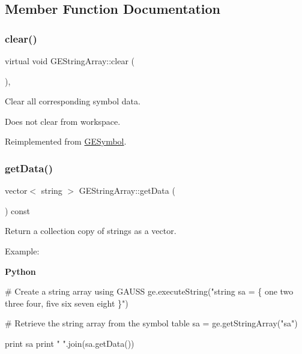 \subsection{Member Function Documentation}
\mbox{\label{class_g_e_string_array_a9bd5bd32a9efeb1e74128bd1d7c5c57d}} 
\subsubsection{\texorpdfstring{clear()}{clear()}}
{\footnotesize\ttfamily virtual void G\+E\+String\+Array\+::clear (\begin{DoxyParamCaption}{ }\end{DoxyParamCaption})\hspace{0.3cm}{\ttfamily [inline]}, {\ttfamily [virtual]}}



Clear all corresponding symbol data. 

Does not clear from workspace. 

Reimplemented from \hyperlink{class_g_e_symbol_a39d2e523aec771a73e1cc5d7a9618b88}{G\+E\+Symbol}.

\mbox{\label{class_g_e_string_array_aa61b05c339d69922cc3469737cedebdb}} 
\subsubsection{\texorpdfstring{get\+Data()}{getData()}}
{\footnotesize\ttfamily vector$<$ string $>$ G\+E\+String\+Array\+::get\+Data (\begin{DoxyParamCaption}{ }\end{DoxyParamCaption}) const}



Return a collection copy of strings as a vector. 

Example\+:

{\bfseries Python} 
\begin{DoxyCode}
\textcolor{comment}{# Create a string array using GAUSS}
ge.executeString(\textcolor{stringliteral}{"string sa = \{ one two three four, five six seven eight \}"})

\textcolor{comment}{# Retrieve the string array from the symbol table}
sa = ge.getStringArray(\textcolor{stringliteral}{"sa"})

\textcolor{keywordflow}{print} sa
\textcolor{keywordflow}{print} \textcolor{stringliteral}{" "}.join(sa.getData())
\end{DoxyCode}


